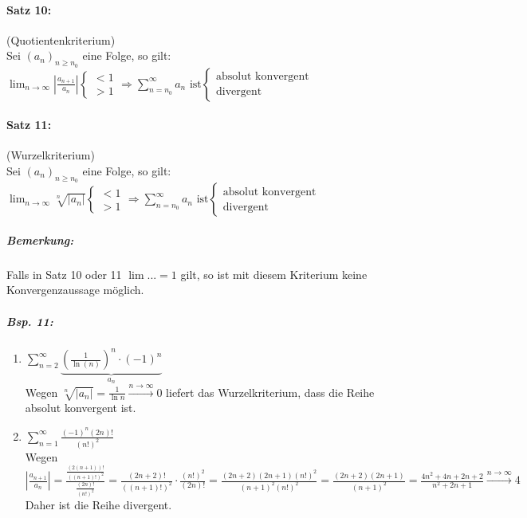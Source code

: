 \begin{enumerate} [label= \arabic*., wide]
\begin{enumerate}[label=(\Alph*),wide]
\paragraph{Satz 10:} (Quotientenkriterium)\\
Sei $(a_n)_{n\geq n_0}$ eine Folge, so gilt:\\
$\boxed{\lim_{n\to\infty}\left|\frac{a_{n+1}}{a_n}\right|\begin{cases}
<1\\
>1
\end{cases}\Rightarrow \sum_{n=n_0}^\infty a_n \text{ ist}\begin{cases}
\text{absolut konvergent}\\
\text{divergent}
\end{cases}}$
\paragraph{Satz 11:} (Wurzelkriterium)\\
Sei $(a_n)_{n\geq n_0}$ eine Folge, so gilt:\\
$\boxed{\lim_{n\to\infty} \sqrt[n]{|a_n|} \begin{cases}
<1\\
>1
\end{cases}\Rightarrow \sum_{n=n_0}^\infty a_n \text{ ist}\begin{cases}
\text{absolut konvergent}\\
\text{divergent}
\end{cases}}$
\subparagraph{Bemerkung:} Falls in Satz 10 oder 11 $\lim ... =1$ gilt, so ist mit diesem Kriterium keine Konvergenzaussage möglich.

\subparagraph{Bsp. 11:}
\begin{enumerate}[label=\alph*.)]
\item $\sum_{n=2}^\infty \underbrace{\left( \frac{1}{\ln(n)}\right)^n \cdot (-1)^n}_{a_n}$\\
Wegen $\sqrt[n]{|a_n|}=\frac{1}{\ln n} \overset{n\to\infty}{\longrightarrow} 0 $ liefert das Wurzelkriterium, dass die Reihe absolut konvergent ist.
\item $\sum_{n=1}^\infty \frac{(-1)^n (2n)!}{(n!)^2}$\\
Wegen $\left|\frac{a_{n+1}}{a_n}\right|=\frac{\frac{(2(n+1))!}{((n+1)!)^2}}{\frac{(2n)!}{(n!)^2}}=\frac{(2n+2)!}{((n+1)!)^2}\cdot \frac{(n!)^2}{(2n)!}=\frac{(2n+2)(2n+1)(n!)^2}{(n+1)^2 (n!)^2}=\frac{(2n+2)(2n+1)}{(n+1)^2}
=\frac{4n^2+4n+2n+2}{n^2+2n+1}\overset{n\to\infty}{\longrightarrow} 4$\\
Daher ist die Reihe divergent.
\end{enumerate}
\end{enumerate}
\end{enumerate}

